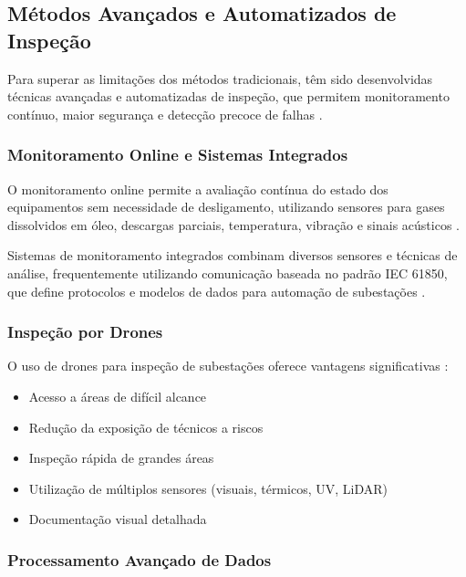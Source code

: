 \subsection{Métodos Avançados e Automatizados de Inspeção}

Para superar as limitações dos métodos tradicionais, têm sido desenvolvidas técnicas avançadas e automatizadas de inspeção, que permitem monitoramento contínuo, maior segurança e detecção precoce de falhas \cite{Wang2024Advancements}.

\subsubsection{Monitoramento Online e Sistemas Integrados}

O monitoramento online permite a avaliação contínua do estado dos equipamentos sem necessidade de desligamento, utilizando sensores para gases dissolvidos em óleo, descargas parciais, temperatura, vibração e sinais acústicos \cite{Clouglobal2024}.

Sistemas de monitoramento integrados combinam diversos sensores e técnicas de análise, frequentemente utilizando comunicação baseada no padrão IEC 61850, que define protocolos e modelos de dados para automação de subestações \cite{Selinc2024}.

\subsubsection{Inspeção por Drones}

O uso de drones para inspeção de subestações oferece vantagens significativas \cite{Pixforce2023}:

\begin{itemize}
    \item Acesso a áreas de difícil alcance
    \item Redução da exposição de técnicos a riscos
    \item Inspeção rápida de grandes áreas
    \item Utilização de múltiplos sensores (visuais, térmicos, UV, LiDAR)
    \item Documentação visual detalhada
\end{itemize}

\subsubsection{Processamento Avançado de Dados}

